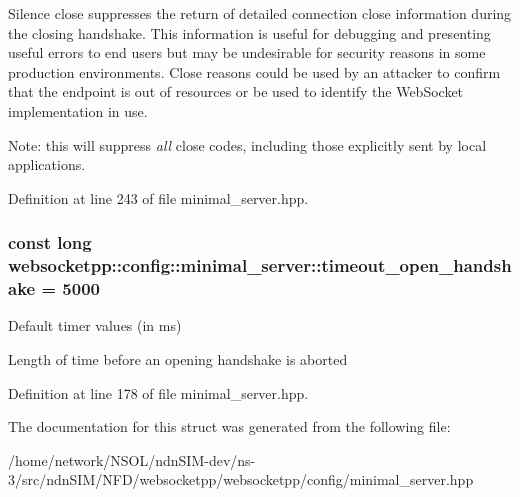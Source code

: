 Silence close suppresses the return of detailed connection close information during the closing handshake. This information is useful for debugging and presenting useful errors to end users but may be undesirable for security reasons in some production environments. Close reasons could be used by an attacker to confirm that the endpoint is out of resources or be used to identify the Web\+Socket implementation in use.

Note\+: this will suppress {\itshape all} close codes, including those explicitly sent by local applications. 

Definition at line 243 of file minimal\+\_\+server.\+hpp.

\subsubsection[{\texorpdfstring{timeout\+\_\+open\+\_\+handshake}{timeout\_open\_handshake}}]{\setlength{\rightskip}{0pt plus 5cm}const long websocketpp\+::config\+::minimal\+\_\+server\+::timeout\+\_\+open\+\_\+handshake = 5000\hspace{0.3cm}{\ttfamily [static]}}\hypertarget{structwebsocketpp_1_1config_1_1minimal__server_a5ea3c55d3cd784ef8cfb8c371a7ec209}{}\label{structwebsocketpp_1_1config_1_1minimal__server_a5ea3c55d3cd784ef8cfb8c371a7ec209}


Default timer values (in ms) 

Length of time before an opening handshake is aborted 

Definition at line 178 of file minimal\+\_\+server.\+hpp.



The documentation for this struct was generated from the following file\+:\begin{DoxyCompactItemize}
\item 
/home/network/\+N\+S\+O\+L/ndn\+S\+I\+M-\/dev/ns-\/3/src/ndn\+S\+I\+M/\+N\+F\+D/websocketpp/websocketpp/config/minimal\+\_\+server.\+hpp\end{DoxyCompactItemize}
